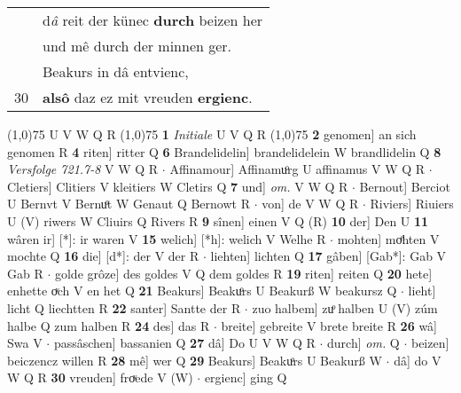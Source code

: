 \documentclass[8pt,a4paper,notitlepage]{article}
\begin{document}
\begin{table}[ht]
\begin{minipage}[t]{0.5\linewidth}
\begin{tabular}{rl}
 & d\textit{â} reit der künec \textbf{durch} beizen her\\ 
 & und mê durch der minnen ger.\\ 
 & Beakurs in dâ entvienc,\\ 
30 & \textbf{alsô} daz ez mit vreuden \textbf{ergienc}.\\ 
\end{tabular}
\scriptsize
\line(1,0){75} \newline
U V W Q R \newline
\line(1,0){75} \newline
\textbf{1} \textit{Initiale} U V Q R  \newline
\line(1,0){75} \newline
\textbf{2} genomen] an sich genomen R \textbf{4} riten] ritter Q \textbf{6} Brandelidelin] brandelidelein W brandlidelin Q \textbf{8} \textit{Versfolge 721.7-8} V W Q R   $\cdot$ Affinamour] Affinamuͦrg U affinamus V W Q R  $\cdot$ Cletiers] Clitiers V kleitiers W Cletirs Q \textbf{7} und] \textit{om.} V W Q R  $\cdot$ Bernout] Berciot U Bernvt V Bernuͦt W Genaut Q Bernowt R  $\cdot$ von] de V W Q R  $\cdot$ Riviers] Riuiers U (V) riwers W Cliuirs Q Rivers R \textbf{9} sînen] einen V Q (R) \textbf{10} der] Den U \textbf{11} wâren ir] [*]: ir waren V \textbf{15} welich] [*h]: welich V Welhe R  $\cdot$ mohten] moͤhten V mochte Q \textbf{16} die] [d*]: der V der R  $\cdot$ liehten] lichten Q \textbf{17} gâben] [Gab*]: Gab V Gab R  $\cdot$ golde grôze] des goldes V Q dem goldes R \textbf{19} riten] reiten Q \textbf{20} hete] enhette oͮch V en het Q \textbf{21} Beakurs] Beakuͦrs U Beakurß W beakursz Q  $\cdot$ lieht] licht Q liechtten R \textbf{22} santer] Santte der R  $\cdot$ zuo halbem] zuͦ halben U (V) zúm halbe Q zum halben R \textbf{24} des] das R  $\cdot$ breite] gebreite V brete breite R \textbf{26} wâ] Swa V  $\cdot$ passâschen] bassanien Q \textbf{27} dâ] Do U V W Q R  $\cdot$ durch] \textit{om.} Q  $\cdot$ beizen] beiczencz willen R \textbf{28} mê] wer Q \textbf{29} Beakurs] Beakuͦrs U Beakurß W  $\cdot$ dâ] do V W Q R \textbf{30} vreuden] froͮede V (W)  $\cdot$ ergienc] ging Q \newline
\end{minipage}
\end{table}
\end{document}
